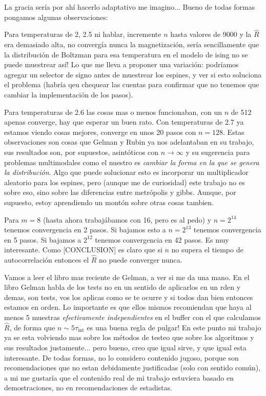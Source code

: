 \documentclass[a4paper, 12pt]{article}
\newcommand{\tauint}{\tau_\text{int}}
\begin{document}
La gracia sería por ahí hacerlo adaptativo me imagino... Bueno de todas formas pongamos algunas observaciones:

Para temperaturas de 2, 2.5 ni hablar, incremente $n$ hasta valores de 9000 y la $\hat{R}$ era demasiado alta, no convergía nunca la magnetización, sería sencillamente que la distribución de Boltzman para esa temperatura en el modelo de ising no se puede muestrear así! Lo que me lleva a proponer una variación: podríamos agregar un selector de signo antes de muestrear los espines, y ver si esto soluciona el problema (habría qeu chequear las cuentas para confirmar que no tenemos que cambiar la implementación de los pasos).

Para temperaturas de 2.6 las cosas mas o menos funcionaban, con un $n$ de 512 apenas converge, hay que esperar un buen rato. Con temperaturas de 2.7 ya estamos viendo cosas mejores, converge en unos 20 pasos con $n = 128$. Estas observaciones son cosas que Gelman y Rubin ya nos adelantaban en su trabajo, sus resultados son, por supuestos, asintóticos con $n \to \infty$ y su sugerencia para problemas multimodales como el nuestro es {\it cambiar la forma en la que se genera la distribución}. Algo que puede solucionar esto es incorporar un multiplicador aleatorio para los espines, pero (aunque me de curiosidad) este trabajo no es sobre eso, sino sobre las diferencias entre metrópolis y gibbs. Aunque, por supuesto, estoy aprendiendo un montón sobre otras cosas tambien.

Para $m = 8$ (hasta ahora trabajábamos con 16, pero es al pedo) y $n = 2^{14}$ tenemos convergencia en 2 pasos. Si bajamos esto a $n = 2^{13}$ tenemos convergencia en 5 pasos. Si bajamos a $2^12$ tenemos convergencia en 42 pasos. Es muy interesante. Como [CONCLUSION] es claro que si $n$ no supera el tiempo de autocorrelación entonces el $\hat{R}$ no puede converger nunca.

Vamos a leer el libro mas reciente de Gelman, a ver si me da una mano. En el libro \cite{gelman2013bayesian} Gelman habla de los tests no en un sentido de aplicarlos en un rden y demas, son tests, vos los aplicas como se te ocurre y si todos dan bien entonces estamos en orden. Lo importante es que ellos mismos recomiendan que haya al menos 5 muestras {\it efectivamente independientes} en el buffer con el que calculamos $\hat{R}$, de forma que $n \sim 5\tauint$ es una buena regla de pulgar! En este punto mi trabajo ya se esta volviendo mas sobre los métodos de testeo que sobre los algoritmos y sus resultados justamente... pero bueno, creo que igual sirve, y que igual esta interesante. De todas formas, no lo considero contenido jugoso, porque son recomendaciones que no estan debidamente justificadas (solo con sentido común), a mi me gustaría que el contenido real de mi trabajo estuviera basado en demostraciones, no en recomendaciones de estadistas.
\end{document}
